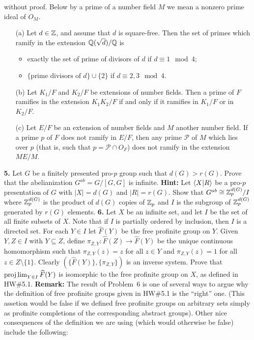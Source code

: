 \documentclass[12pt]{amsart}
\begin{document}
without proof. Below by a prime of a number field $M$ we mean a nonzero prime ideal of $O_M$.
\begin{itemize}
\item[(a)] Let $d\in{\mathbb Z}$, and assume that $d$ is square-free. Then the set of primes which ramify in the extension 
${\mathbb Q}(\sqrt{d})/{\mathbb Q}$ is 
\begin{itemize}
\item exactly the set of prime of divisors of $d$ if $d\equiv 1\mod 4$; 
\item $\{\mbox{prime divisors of }d\}\cup\{2\}$ if $d\equiv 2,3\mod 4$.
\end{itemize}
\item[(b)] Let $K_1/F$ and $K_2/F$ be extensions of number fields. Then a prime of $F$ ramifies in the extension $K_1K_2/F$
if and only if it ramifies in $K_1/F$ or in $K_2/F$.
\item[(c)] Let $E/F$ be an extension of number fields and $M$ another number field. If a prime $p$ of $F$ does not ramify in $E/F$,
then any prime $\mathcal P$ of $M$ which lies over $p$ (that is, such that $p=\mathcal P\cap O_F$) does not ramify in the extension $ME/M$.
\end{itemize}
\skv
{\bf 5.} Let $G$ be a finitely presented pro-$p$ group such that $d(G)>r(G)$. Prove that the abelianization $G^{ab}=G/[G,G]$ is infinite.
{\bf Hint:} Let ${\langle} X|R{\rangle}$ be a pro-$p$ presentation of $G$ with $|X|=d(G)$ and $|R|=r(G)$. Show that 
$G^{ab}\cong {\mathbb Z}_p^{d(G)}/I$ where ${\mathbb Z}_p^{d(G)}$ is the product of $d(G)$ copies of ${\mathbb Z}_p$ and $I$ is the subgroup of ${\mathbb Z}_p^{d(G)}$
generated by $r(G)$ elements.
\skv
{\bf 6.} Let $X$ be an infinite set, and let $I$ be the set of all finite subsets of $X$. Note that if $I$ is partially ordered by inclusion,
then $I$ is a directed set. For each $Y\in I$ let $\widehat F(Y)$ be the free profinite group on $Y$. Given $Y,Z\in I$ with $Y\subseteq Z$,
define $\pi_{Z,Y}: \widehat F(Z)\to \widehat F(Y)$ be the unique continuous homomorphism such that $\pi_{Z,Y}(z)=z$ for all $z\in Y$
and $\pi_{Z,Y}(z)=1$ for all $z\in Z\setminus\{1\}$. Clearly $(\{\widehat F(Y)\},\{\pi_{Z,Y}\})$ is an inverse system. Prove that
$\projlim_{Y\in I}\widehat F(Y)$ is isomorphic to the free profinite group on $X$, as defined in HW\#5.1. 
\skv
{\bf Remark:} The result of Problem~6 is one of several ways to argue why the definition of free profinite groups given in HW\#5.1
is the ``right'' one. (This assetion would be false if we defined free profinite groups on arbitrary sets simply as profinite completions of the corresponding abstract groups). Other nice consequences of the definition we are using (which would otherwise be false) include the following:
\end{document}
